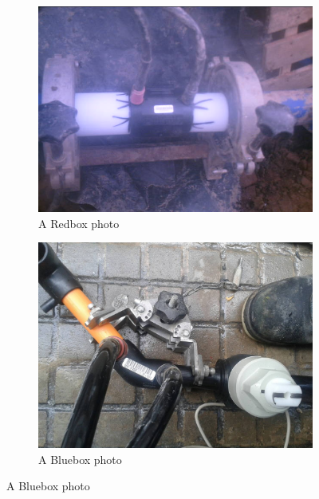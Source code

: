 \documentclass[a4paper,11pt]{article}
\begin{document}
\begin{figure}
    \centering
    \begin{minipage}[b]{\textwidth}
      \begin{subfigure}{.5\textwidth} 
        \centering
        \includegraphics[scale=0.34]{images/perfect3.jpg}
        \caption{A Redbox photo}\label{fig:2a}
      \end{subfigure}%
      \begin{subfigure}{.5\textwidth} 
        \centering
        \includegraphics[scale=0.17]{images/niceBluebox_100974.jpg}
        \caption{A Bluebox photo}\label{fig:2b}
      \end{subfigure} \par \vspace*{20pt} %
    \end{minipage}%
\end{figure}
\end{document}
